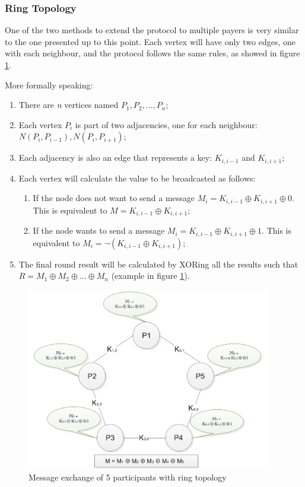 \subsubsection{Ring Topology} \label{sec:ringtopology}
One of the two methods to extend the protocol to multiple payers is very similar to the one presented up to this point. Each vertex will have only two edges, one with each neighbour, and the protocol follows the same rules, as showed in figure \ref{fig:nparticipants1}.

More formally speaking: 
\begin{enumerate}
    \item There are \textit{n} vertices named \textit{$P_1, P_2, ..., P_n$};
    \item Each vertex \textit{$P_i$} is part of two adjacencies, one for each neighbour: \textit{$N(P_i,P_{i-1}), N(P_i, P_{i+1})$};
    \item Each adjacency is also an edge that represents a key: \textit{$K_{i,i-1}$} and \textit{$K_{i,i+1}$};
    \item Each vertex will calculate the value to be broadcasted as follows: \begin{enumerate}
        \item If the node does not want to send a message \textit{$M_i = K_{i,i-1} \oplus K_{i,i+1} \oplus 0 $}. This is equivalent to \textit{$M = K_{i,i-1} \oplus K_{i,i+1}$};
        \item If the node wants to send a message \textit{$M_i = K_{i,i-1} \oplus K_{i,i+1} \oplus 1 $}. This is equivalent to \textit{$M_i = \neg(K_{i,i-1} \oplus K_{i,i+1}) $};
    \end{enumerate}
    \item The final round result will be calculated by XORing all the results such that \textit{$R = M_1 \oplus M_2 \oplus ... \oplus M_n$} (example in figure \ref{fig:nparticipants1}).
\end{enumerate}


\begin{figure}[h!]
    \centering
    \includegraphics[width=0.95\textwidth]{Images/nparticipants1.png}
    \caption{Message exchange of 5 participants with ring topology}
    \label{fig:nparticipants1}
\end{figure}


